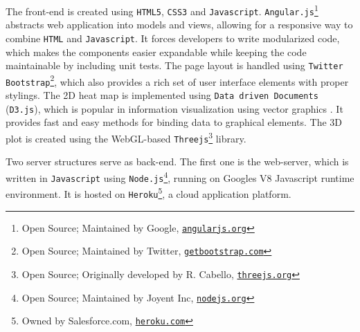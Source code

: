 \documentclass[journal]{style/vgtc} 			          %
\begin{document}
The front-end is created using \texttt{HTML5}, \texttt{CSS3} and \texttt{Javascript}.
\texttt{Angular.js}\footnote{Open Source; Maintained by Google, \href{https://www.angularjs.org/}{\texttt{angularjs.org}}} abstracts web application into models and views, allowing for a responsive way to combine \texttt{HTML} and \texttt{Javascript}.
It forces developers to write modularized code, which makes the components easier expandable while keeping the code maintainable by including unit tests.
The page layout is handled using \texttt{Twitter Bootstrap}\footnote{Open Source; Maintained by Twitter, \href{http://getbootstrap.com}{\texttt{getbootstrap.com}}}, which also provides a rich set of user interface elements with proper stylings.
The 2D heat map is implemented using \texttt{Data driven Documents} (\texttt{D3.js}), which is popular in information visualization using vector graphics \cite{D3}.
It provides fast and easy methods for binding data to graphical elements.
The 3D plot is created using the WebGL-based \texttt{Threejs}\footnote{Open Source; Originally developed by R. Cabello, \href{http://threejs.org}{\texttt{threejs.org}}} library.

Two server structures serve as back-end.
The first one is the web-server, which is written in \texttt{Javascript} using \texttt{Node.js}\footnote{Open Source; Maintained by Joyent Inc, \href{http://nodejs.org}{\texttt{nodejs.org}}}, running on Googles V8 Javascript runtime environment.
It is hosted on \texttt{Heroku}\footnote{Owned by Salesforce.com, \href{https://www.heroku.com/}{\texttt{heroku.com}}}, a cloud application platform.
\end{document}
